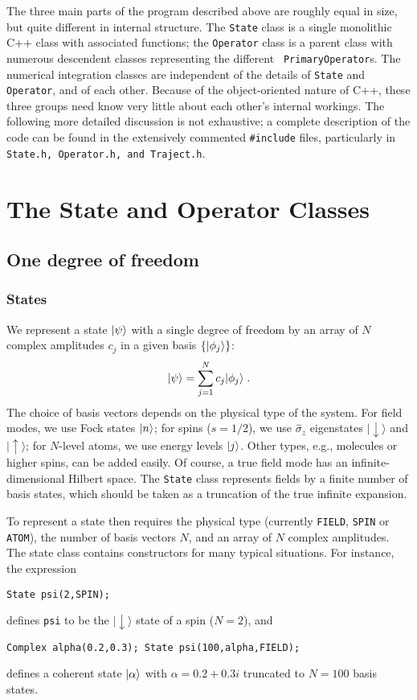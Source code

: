 The three main parts of the program described above are roughly equal in size,
but quite different in internal structure.  The {\tt State} class is a single
monolithic C++ class with associated functions; the {\tt Operator} class is a
parent class with numerous descendent classes representing the different {\tt
PrimaryOperator}s.  The numerical integration classes are independent of the
details of {\tt State} and {\tt Operator}, and of each other.  Because of the
object-oriented nature of C++, these three groups need know very little about
each other's internal workings. The following more detailed discussion is not
exhaustive; a complete description of the code can be found in the extensively
commented {\tt \#include} files, particularly in {\tt State.h, Operator.h, and
Traject.h}.


\section{The State and Operator Classes}

\subsection{One degree of freedom}

\subsubsection{States}

We represent a state $| \psi \rangle$ with a single degree of freedom by an
array of $N$ complex amplitudes $c_j$ in a given basis
$\{| \phi_j \rangle\}$:
\begin{equation}
| \psi \rangle = \sum_{j=1}^N c_j| \phi_j \rangle \;.
\end{equation}
The choice of basis vectors depends on the physical type of the system. For
field modes, we use Fock states $| n \rangle$; for spins ($s=1/2$), we use
$\hat\sigma_z$ eigenstates $|\!\downarrow\rangle$ and $|\!\uparrow\rangle$; for
$N$-level atoms, we use energy levels $| j \rangle$. Other types, e.g., molecules
or higher spins, can be added easily. Of course, a true field mode
has an infinite-dimensional Hilbert space.  The {\tt State} class represents
fields by a finite number of basis states, which should be taken as a
truncation of the true infinite expansion.

To represent a state then requires the physical type (currently {\tt FIELD},
{\tt SPIN} or {\tt ATOM}), the number of basis vectors $N$, and an array of $N$
complex amplitudes. The state class contains constructors for many typical
situations. For instance, the expression
\begin{verbatim}
State psi(2,SPIN);
\end{verbatim}
defines {\tt psi} to be the $|\!\downarrow\rangle$ state of a spin ($N=2$), and
\begin{verbatim}
Complex alpha(0.2,0.3); State psi(100,alpha,FIELD);
\end{verbatim}
defines a coherent state $| \alpha \rangle$ with $\alpha=0.2+0.3i$ truncated to
$N=100$ basis states.

